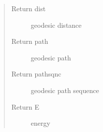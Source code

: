 \documentclass[letterpaper,10pt,english]{sphinxmanual}
\begin{document}
\begin{fulllineitems}
\begin{quote}
\begin{description}
\item[{Return dist}] \leavevmode
geodesic distance

\item[{Return path}] \leavevmode
geodesic path

\item[{Return pathsqnc}] \leavevmode
geodesic path sequence

\item[{Return E}] \leavevmode
energy

\end{description}\end{quote}

\end{fulllineitems}

\end{document}
